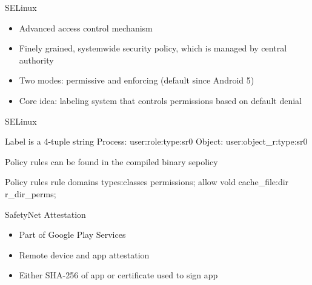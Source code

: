 \documentclass[
    11pt,%
    aspectratio=169,%
]{beamer}
\begin{document}
\begin{frame}{SELinux}
\begin{itemize}
  \item Advanced access control mechanism\newline
  \item Finely grained, systemwide security policy, which is managed by central authority\newline
  \item Two modes: \alert{permissive} and \alert{enforcing} (default since Android 5)\newline
  \item Core idea: labeling system that controls permissions based on default \alert{denial}\newline
\end{itemize}

\end{frame}

\begin{frame}{SELinux}
\begin{exampleblock}{Label is a 4-tuple string}
  Process: user:\alert{role}:type:sr0\newline
  Object: user:\alert{object\_r}:type:sr0
\end{exampleblock}
Policy rules can be found in the compiled binary \alert{sepolicy}\newline
\begin{exampleblock}{Policy rules}
  rule domains types:classes permissions;\newline
  allow vold cache\_file:dir r\_dir\_perms;
\end{exampleblock}
\end{frame}






\begin{frame}{SafetyNet Attestation}
\begin{itemize}
  \item Part of Google Play Services\newline
  \item Remote device and app attestation\newline
  \item Either SHA-256 of app or certificate used to sign app\newline

\end{itemize}
\end{frame}
\end{document}
